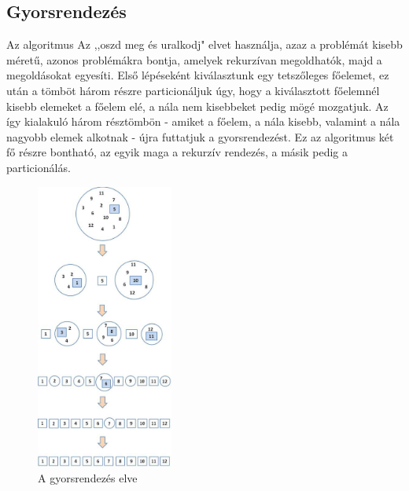 \documentclass[12pt,margin=0px]{article}
\begin{document}
	\subsection*{Gyorsrendezés}
	
    \noindent Az algoritmus Az ,,oszd meg és uralkodj" elvet használja, azaz a problémát kisebb méretű, azonos problémákra bontja, amelyek rekurzívan megoldhatók, majd a megoldásokat egyesíti. Első lépéseként kiválasztunk egy tetszőleges főelemet, ez után a tömböt három részre particionáljuk úgy, hogy a kiválasztott főelemnél kisebb elemeket a főelem elé, a nála nem kisebbeket pedig mögé mozgatjuk. Az így kialakuló három résztömbön - amiket a főelem, a nála kisebb, valamint a nála nagyobb elemek alkotnak - újra futtatjuk a gyorsrendezést. Ez az algoritmus két fő részre bontható, az egyik maga a rekurzív rendezés, a másik pedig a particionálás.

	\begin{figure}[H]
		\centering
        \includegraphics[width=0.4\textwidth]{img/quicksort_sample.png}
		\caption{A gyorsrendezés elve}
	\end{figure}
\end{document}
